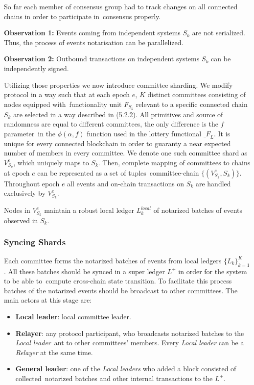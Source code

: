 So far each member of consensus group had to track changes on all connected chains in order to participate in\
consensus properly.

\textbf{Observation 1:} Events coming from independent systems $S_k$ are not serialized.
Thus, the process of events notarisation can be parallelized.

\textbf{Observation 2:} Outbound transactions on independent systems $S_k$ can be independently signed.

Utilizing those properties we now introduce committee sharding.
We modify protocol in a way such that at each epoch $e$, $K$ distinct committees consisting of nodes equipped with\
functionality unit $F_{S_k}$ relevant to a specific connected chain $S_k$ are selected in a way described in (5.2.2).
All primitives and source of randomness are equal to different committees, the only difference is the $f$ parameter\
in the $\phi(\alpha, f)$ function used in the lottery functional ${\mathcal_{F}}_{L}$.
It is unique for every connected blockchain in order to guaranty a near expected number of members in every committee.
We denote one such committee shard as $V^{e}_{S_k}$, which uniquely maps to $S_k$.
Then, complete mapping of committees to chains at epoch $e$ can be represented as a set of tuples\
committee-chain $\{(V^{e}_{S_k}, S_k)\}$.
Throughout epoch $e$ all events and on-chain transactions on $S_k$ are handled exclusively by $V^{e}_{S_k}$.

Nodes in $V^{e}_{S_k}$ maintain a robust local ledger $L^{local}_k$ of notarized batches of events observed in $S_k$.

\subsubsection{Syncing Shards}

Each committee forms the notarized batches of events from local ledgers $\{L_k\}_{k=1}^{K}$.
All these batches should be synced in a super ledger $L^+$ in order for the system to be able to\
compute cross-chain state transition.
To facilitate this process batches of the notarized events should be broadcast to other committees.
The main actors at this stage are:
\begin{itemize}
    \item \textbf{Local leader}: local committee leader.
    \item \textbf{Relayer}: any protocol participant, who broadcasts notarized batches to the \emph{Local leader}\
    ant to other committees' members.
    Every \emph{Local leader} can be a \emph{Relayer} at the same time.
    \item \textbf{General leader}: one of the \emph{Local leaders} who added a block consisted of collected\
    notarized batches and other internal transactions to the $L^+$.
\end{itemize}

